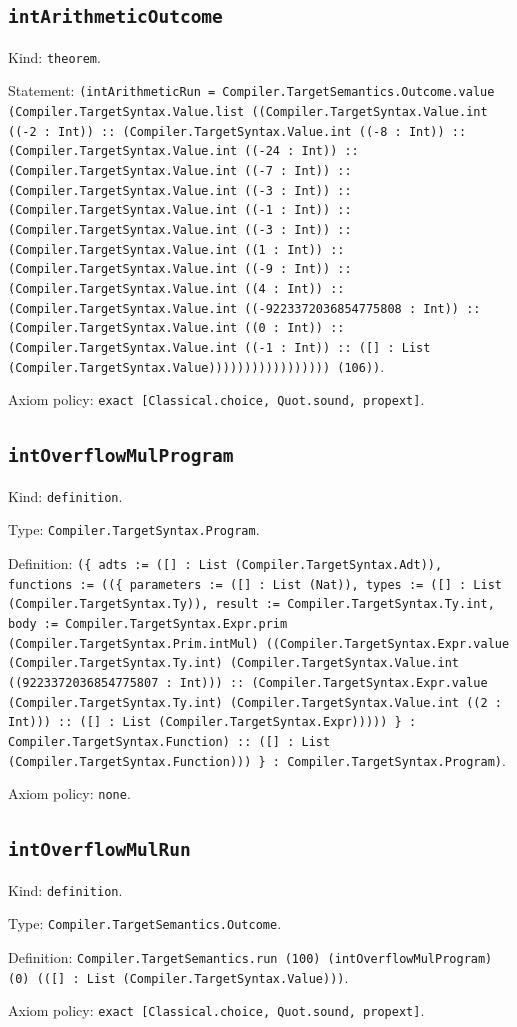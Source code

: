 \documentclass[11pt]{article}
\begin{document}
\subsection*{\texttt{intArithmeticOutcome}}
\noindent Kind: \texttt{theorem}.\par
\noindent Statement: \texttt{(intArithmeticRun = Compiler.TargetSemantics.Outcome.value (Compiler.TargetSyntax.Value.list ((Compiler.TargetSyntax.Value.int ((-2 : Int)) :: (Compiler.TargetSyntax.Value.int ((-8 : Int)) :: (Compiler.TargetSyntax.Value.int ((-24 : Int)) :: (Compiler.TargetSyntax.Value.int ((-7 : Int)) :: (Compiler.TargetSyntax.Value.int ((-3 : Int)) :: (Compiler.TargetSyntax.Value.int ((-1 : Int)) :: (Compiler.TargetSyntax.Value.int ((-3 : Int)) :: (Compiler.TargetSyntax.Value.int ((1 : Int)) :: (Compiler.TargetSyntax.Value.int ((-9 : Int)) :: (Compiler.TargetSyntax.Value.int ((4 : Int)) :: (Compiler.TargetSyntax.Value.int ((-9223372036854775808 : Int)) :: (Compiler.TargetSyntax.Value.int ((0 : Int)) :: (Compiler.TargetSyntax.Value.int ((-1 : Int)) :: ([] : List (Compiler.TargetSyntax.Value))))))))))))))))) (106))}.\par
\noindent Axiom policy: \texttt{exact [Classical.choice, Quot.sound, propext]}.\par
\subsection*{\texttt{intOverflowMulProgram}}
\noindent Kind: \texttt{definition}.\par
\noindent Type: \texttt{Compiler.TargetSyntax.Program}.\par
\noindent Definition: \texttt{(\{ adts := ([] : List (Compiler.TargetSyntax.Adt)), functions := ((\{ parameters := ([] : List (Nat)), types := ([] : List (Compiler.TargetSyntax.Ty)), result := Compiler.TargetSyntax.Ty.int, body := Compiler.TargetSyntax.Expr.prim (Compiler.TargetSyntax.Prim.intMul) ((Compiler.TargetSyntax.Expr.value (Compiler.TargetSyntax.Ty.int) (Compiler.TargetSyntax.Value.int ((9223372036854775807 : Int))) :: (Compiler.TargetSyntax.Expr.value (Compiler.TargetSyntax.Ty.int) (Compiler.TargetSyntax.Value.int ((2 : Int))) :: ([] : List (Compiler.TargetSyntax.Expr))))) \} : Compiler.TargetSyntax.Function) :: ([] : List (Compiler.TargetSyntax.Function))) \} : Compiler.TargetSyntax.Program)}.\par
\noindent Axiom policy: \texttt{none}.\par
\subsection*{\texttt{intOverflowMulRun}}
\noindent Kind: \texttt{definition}.\par
\noindent Type: \texttt{Compiler.TargetSemantics.Outcome}.\par
\noindent Definition: \texttt{Compiler.TargetSemantics.run (100) (intOverflowMulProgram) (0) (([] : List (Compiler.TargetSyntax.Value)))}.\par
\noindent Axiom policy: \texttt{exact [Classical.choice, Quot.sound, propext]}.\par
\end{document}
